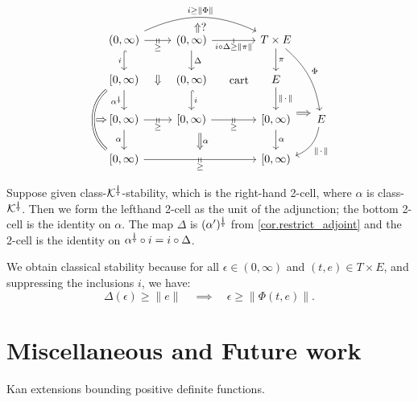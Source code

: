 \documentclass[11pt, one side, article]{memoir}
\theoremstyle{definition}
\theoremstyle{plain}
\newcommand{\cat}[1]{\mathcal{#1}}%
\newcommand{\ldag}{^{\rotatebox{180}{$\dagger$}}}
\newcommand{\blank}[1][1pt]{\hspace{#1}\cdot\hspace{#1}}
\newcommand{\K}{\cat{K}}
\newcommand{\Kdag}[1][0]{\K\ldag}
\newcommand{\tick}{\shortmid}
\newcommand{\ttick}{\shortmid\shortmid}
\begin{document}
\[
\begin{tikzcd}
	{(0,\infty)}
		\ar[d, hook, "i"']\ar[r, "\ttick"{marking, name=A1}, "\geq" below=1pt]
		\ar[rr, bend left=25pt, "i\geq \|\Phi\|", ""' name=D1]
	&
	|[alias=D2]|{(0,\infty)}
		\ar[d, "\Delta"]
		\ar[r, "\tick"{marking}, "i\circ\Delta\geq\|\pi\|"']
	&[15pt]
	T\times E
		\ar[d, "\pi"]\ar[ddr, bend left=20pt, "\Phi"]
	\\
	{[0,\infty)}
		\ar[dd, shift right=5pt, bend right=50pt, equal, "" name=C1]\ar[d, "\alpha\ldag"']
	&
	{(0,\infty)}
		\ar[d, hook, "i"]
	&
	E
		\ar[l, phantom, "\text{cart}"]
		\ar[d, "\|\blank\|"]
	\\
	|[alias=C2]|{[0,\infty)}
		\ar[r, "\ttick"{marking, name=A2}, "\geq" below=1pt]
		\ar[d, "\alpha"']
	&
	|[alias=B1]|{[0,\infty)}
		\ar[r, "\ttick"{marking}, "\geq" below=1pt]
	&
	{[0,\infty)}
		\ar[d, "\alpha"]\ar[r, Rightarrow, yshift=6pt, shorten=1pt]
	&[-10pt]
	E
		\ar[dl, bend left, "\|\blank\|"]
	\\
	{[0,\infty)}\ar[rr, "\ttick"{marking, name=B2}, "\geq" below=1pt]
	&&
	{[0,\infty)}
		\ar[from=A1, to=A2, Rightarrow, shorten=25pt]
		\ar[from=B1.south-|B2, to=B2, Rightarrow, shorten=3pt, "\alpha"]
		\ar[from=C1, to=C2, Rightarrow, shorten=-2pt]
		\ar[from=D1, to=D1|-D2, pos=.3, phantom, "\Uparrow?"]
\end{tikzcd}
\]

Suppose given class-$\Kdag$-stability, which is the right-hand 2-cell, where $\alpha$ is class-$\Kdag$. Then we form the lefthand 2-cell as the unit of the adjunction; the bottom 2-cell is the identity on $\alpha$. The map $\Delta$ is $(\alpha')\ldag$ from \cref{cor.restrict_adjoint} and the 2-cell is the identity on $\alpha\ldag\circ i=i\circ\Delta$. 

We obtain classical stability because for all $\epsilon\in(0,\infty)$ and $(t,e)\in T\times E$, and suppressing the inclusions $i$, we have:
\[
  \Delta(\epsilon)\geq \|e\|
  \quad\implies\quad
	\epsilon\geq\|\Phi(t,e)\|.
\]


\chapter{Miscellaneous and Future work}

Kan extensions bounding positive definite functions.
\end{document}

